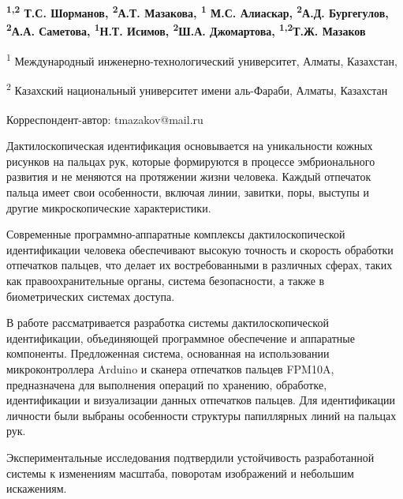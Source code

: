 
\begin{articleheader}

{\bfseries \textsuperscript{1,2}
Т.С. Шорманов, \textsuperscript{2}А.Т.  Мазакова, \textsuperscript{1}
М.С. Алиаскар, \textsuperscript{2}А.Д.
Бургегулов, \textsuperscript{2}А.А. Саметова, \textsuperscript{1}Н.Т. Исимов, \textsuperscript{2}Ш.А.
Джомартова, \textsuperscript{1,2}Т.Ж. Мазаков\textsuperscript{\envelope }}
\end{articleheader}

\begin{affiliation}
\textsuperscript{1} Международный инженерно-технологический университет,
Алматы, Казахстан,

\textsuperscript{2} Казахский национальный университет имени аль-Фараби,
Алматы, Казахстан

\raggedright {\bfseries \textsuperscript{\envelope }}Корреспондент-автор: tmazakov@mail.ru
\end{affiliation}

Дактилоскопическая идентификация основывается на уникальности кожных
рисунков на пальцах рук, которые формируются в процессе эмбрионального
развития и не меняются на протяжении жизни человека. Каждый отпечаток
пальца имеет свои особенности, включая линии, завитки, поры, выступы и
другие микроскопические характеристики.

Современные программно-аппаратные комплексы дактилоскопической
идентификации человека обеспечивают высокую точность и скорость
обработки отпечатков пальцев, что делает их востребованными в различных
сферах, таких как правоохранительные органы, система безопасности, а
также в биометрических системах доступа.

В работе рассматривается разработка системы дактилоскопической
идентификации, объединяющей программное обеспечение и аппаратные
компоненты. Предложенная система, основанная на использовании
микроконтроллера Arduino и сканера отпечатков пальцев FPM10A,
предназначена для выполнения операций по хранению, обработке,
идентификации и визуализации данных отпечатков пальцев. Для
идентификации личности были выбраны особенности структуры папиллярных
линий на пальцах рук.

Экспериментальные исследования подтвердили устойчивость разработанной
системы к изменениям масштаба, поворотам изображений и небольшим
искажениям.

